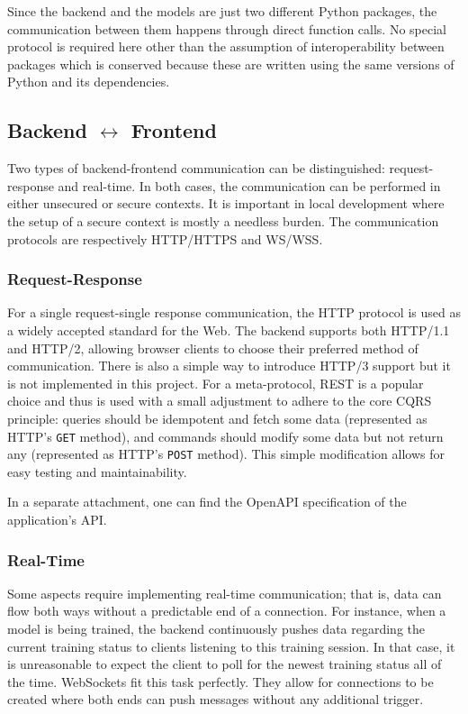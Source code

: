 \documentclass[a4paper, 11pt, twoside]{report}
\theoremstyle{definition}
\begin{document}
Since the backend and the models are just two different Python packages, the communication between them happens through direct function calls. No special protocol is required here other than the assumption of interoperability between packages which is conserved because these are written using the same versions of Python and its dependencies. \par

\subsection{Backend \texorpdfstring{$\leftrightarrow$}{<->} Frontend}

Two types of backend-frontend communication can be distinguished: request-response and real-time. In both cases, the communication can be performed in either unsecured or secure contexts. It is important in local development where the setup of a secure context is mostly a needless burden. The communication protocols are respectively HTTP/HTTPS and WS/WSS. \par

\subsubsection{Request-Response}

For a single request-single response communication, the HTTP protocol is used as a widely accepted standard for the Web. The backend supports both HTTP/1.1 and HTTP/2, allowing browser clients to choose their preferred method of communication. There is also a simple way to introduce HTTP/3 support but it is not implemented in this project. For a meta-protocol, REST is a popular choice and thus is used with a small adjustment to adhere to the core CQRS \cite{CQRS} principle: queries should be idempotent and fetch some data (represented as HTTP's \texttt{GET} method), and commands should modify some data but not return any (represented as HTTP's \texttt{POST} method). This simple modification allows for easy testing and maintainability. \par
In a separate attachment, one can find the OpenAPI specification of the application's API. \par

\subsubsection{Real-Time}

Some aspects require implementing real-time communication; that is, data can flow both ways without a predictable end of a connection. For instance, when a model is being trained, the backend continuously pushes data regarding the current training status to clients listening to this training session. In that case, it is unreasonable to expect the client to poll for the newest training status all of the time. WebSockets fit this task perfectly. They allow for connections to be created where both ends can push messages without any additional trigger. \par
\end{document}

